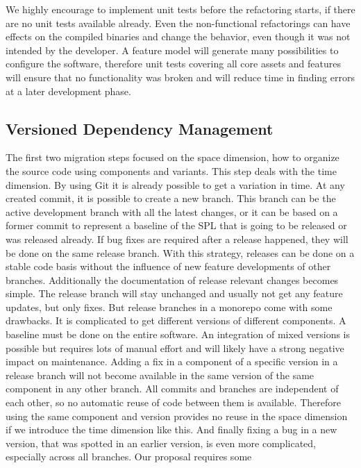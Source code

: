We highly encourage to implement unit tests before the refactoring starts, if
there are no unit tests available already. Even the non-functional refactorings
can have effects on the compiled binaries and change the behavior, even though
it was not intended by the developer. A feature model will generate many
possibilities to configure the software, therefore unit tests covering all core
assets and features will ensure that no functionality was broken and will reduce
time in finding errors at a later development phase.

\subsection{Versioned Dependency Management}\label{dependencies}

The first two migration steps focused on the space dimension, how to organize
the source code using components and variants. This step deals with the time
dimension. By using Git it is already possible to get a variation in time. At
any created commit, it is possible to create a new branch. This branch can be
the active development branch with all the latest changes, or it can be based on
a former commit to represent a baseline of the SPL that is going to be released
or was released already. If bug fixes are required after a release happened,
they will be done on the same release branch. With this strategy, releases can
be done on a stable code basis without the influence of new feature developments
of other branches. Additionally the documentation of release relevant changes
becomes simple. The release branch will stay unchanged and usually not get any
feature updates, but only fixes. But release branches in a monorepo come with
some drawbacks. It is complicated to get different versions of different
components. A baseline must be done on the entire software. An integration of
mixed versions is possible but requires lots of manual effort and will likely
have a strong negative impact on maintenance. Adding a fix in a component of a
specific version in a release branch will not become available in the same
version of the same component in any other branch. All commits and branches are
independent of each other, so no automatic reuse of code between them is
available. Therefore using the same component and version provides no reuse in
the space dimension if we introduce the time dimension like this. And finally
fixing a bug in a new version, that was spotted in an earlier version, is even
more complicated, especially across all branches. Our proposal requires some
